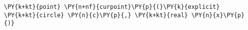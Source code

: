 \begin{Verbatim}[commandchars=\\\{\}]
    \PY{k+kt}{point} \PY{n+nf}{curpoint}\PY{p}{(}\PY{k}{explicit} \PY{k+kt}{circle} \PY{n}{c}\PY{p}{,} \PY{k+kt}{real} \PY{n}{x}\PY{p}{)}
\end{Verbatim}
